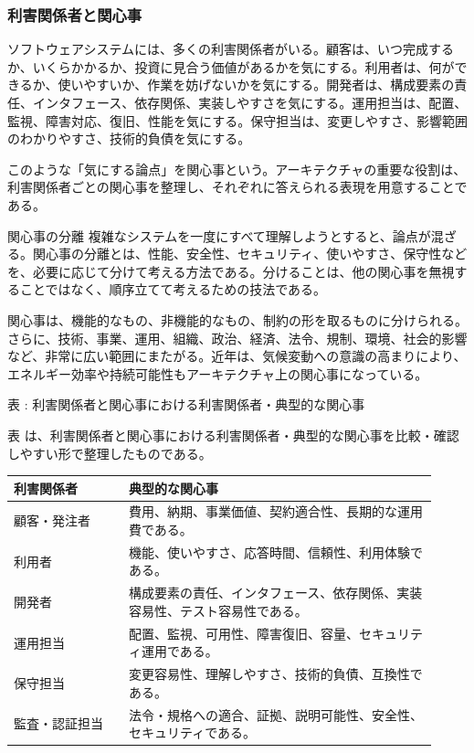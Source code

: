 \subsubsection{利害関係者と関心事}
ソフトウェアシステムには、多くの利害関係者がいる。顧客は、いつ完成するか、いくらかかるか、投資に見合う価値があるかを気にする。利用者は、何ができるか、使いやすいか、作業を妨げないかを気にする。開発者は、構成要素の責任、インタフェース、依存関係、実装しやすさを気にする。運用担当は、配置、監視、障害対応、復旧、性能を気にする。保守担当は、変更しやすさ、影響範囲のわかりやすさ、技術的負債を気にする。

このような「気にする論点」を関心事という。アーキテクチャの重要な役割は、利害関係者ごとの関心事を整理し、それぞれに答えられる表現を用意することである。

\begin{statementbox}{関心事の分離}
複雑なシステムを一度にすべて理解しようとすると、論点が混ざる。関心事の分離とは、性能、安全性、セキュリティ、使いやすさ、保守性などを、必要に応じて分けて考える方法である。分けることは、他の関心事を無視することではなく、順序立てて考えるための技法である。
\end{statementbox}

関心事は、機能的なもの、非機能的なもの、制約の形を取るものに分けられる。さらに、技術、事業、運用、組織、政治、経済、法令、規制、環境、社会的影響など、非常に広い範囲にまたがる。近年は、気候変動への意識の高まりにより、エネルギー効率や持続可能性もアーキテクチャ上の関心事になっている。

\par\smallskip\noindent{}\label{tab:ch02-02}表 \thetable: 利害関係者と関心事における利害関係者・典型的な関心事\par\smallskip
表 \thetable は、利害関係者と関心事における利害関係者・典型的な関心事を比較・確認しやすい形で整理したものである。\par\smallskip
\begin{longtable}{P{0.25\linewidth}P{0.67\linewidth}}
\toprule
利害関係者 & 典型的な関心事 \\
\midrule
顧客・発注者 & 費用、納期、事業価値、契約適合性、長期的な運用費である。 \\
利用者 & 機能、使いやすさ、応答時間、信頼性、利用体験である。 \\
開発者 & 構成要素の責任、インタフェース、依存関係、実装容易性、テスト容易性である。 \\
運用担当 & 配置、監視、可用性、障害復旧、容量、セキュリティ運用である。 \\
保守担当 & 変更容易性、理解しやすさ、技術的負債、互換性である。 \\
監査・認証担当 & 法令・規格への適合、証拠、説明可能性、安全性、セキュリティである。 \\
\bottomrule
\end{longtable}

